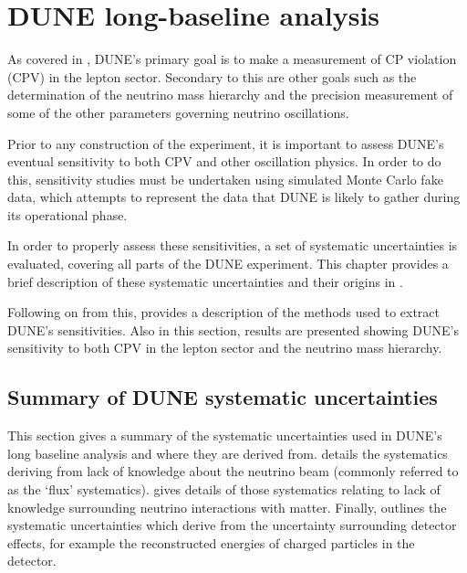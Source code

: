 \chapter{DUNE long-baseline analysis}
\label{sec:dune_lbl}

As covered in , DUNE's primary goal is to make a measurement of CP violation (CPV) in the lepton sector.
Secondary to this are other goals such as the determination of the neutrino mass hierarchy and the precision measurement of some of the other parameters governing neutrino oscillations.

Prior to any construction of the experiment, it is important to assess DUNE's eventual sensitivity to both CPV and other oscillation physics.
In order to do this, sensitivity studies must be undertaken using simulated Monte Carlo fake data, which attempts to represent the data that DUNE is likely to gather during its operational phase.

In order to properly assess these sensitivities, a set of systematic uncertainties is evaluated, covering all parts of the DUNE experiment.
This chapter provides a brief description of these systematic uncertainties and their origins in .

Following on from this,  provides a description of the methods used to extract DUNE's sensitivities.
Also in this section, results are presented showing DUNE's sensitivity to both CPV in the lepton sector and the neutrino mass hierarchy.

\section{Summary of DUNE systematic uncertainties}
\label{sec:dune_lbl:systs}

This section gives a summary of the systematic uncertainties used in DUNE's long baseline analysis and where they are derived from.
 details the systematics deriving from lack of knowledge about the neutrino beam (commonly referred to as the `flux' systematics).
 gives details of those systematics relating to lack of knowledge surrounding neutrino interactions with matter.
Finally,  outlines the systematic uncertainties which derive from the uncertainty surrounding detector effects, for example the reconstructed energies of charged particles in the detector.

